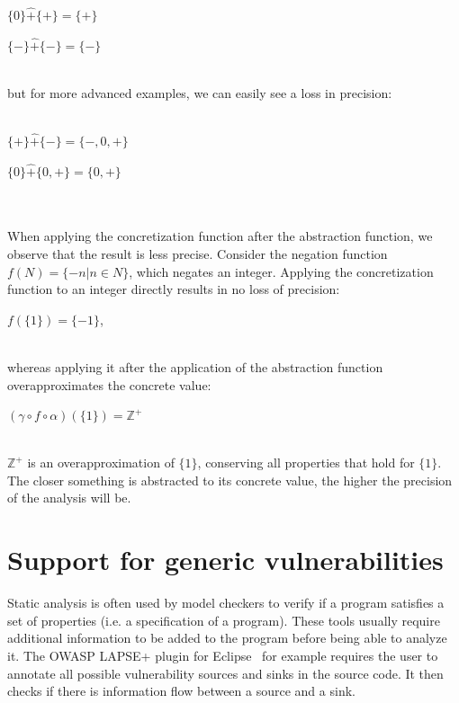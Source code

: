 \begin{exmp}
\centerline{$\{0\}  \hat{+}  \{+\} = \{+\}$}
\centerline{$\{-\}  \hat{+}  \{-\} = \{-\}$}
\leavevmode \\
but for more advanced examples, we can easily see a loss in precision:\\\\
\centerline{$\{+\}  \hat{+}  \{-\} = \{-,0,+\}$}
\centerline{$\{0\}  \hat{+}  \{0,+\} = \{0,+\}$}
\\\\
When applying the concretization function after the abstraction function, we observe that the result is less precise. Consider the negation function $f(N) = \{-n \vert n \in N\}$, which negates an integer. Applying the concretization function to an integer directly results in no loss of precision:\\ 
\centerline{$f(\{1\}) = \{-1\}$,}\\ whereas applying it after the application of the abstraction function overapproximates the concrete value: \\
\centerline{$(\gamma \circ f \circ \alpha)(\{1\}) = \mathbb{Z}^+$}\\
$\mathbb{Z}^+$ is an overapproximation of $\{1\}$, conserving all properties that hold for $\{1\}$. The closer something is abstracted to its concrete value, the higher the precision of the analysis will be.
\end{exmp}


\section{Support for generic vulnerabilities}
\label{sec:genericVulnerabilities}

Static analysis is often used by model checkers to verify if a program satisfies a set of properties (i.e. a specification of a program). These tools usually require additional information to be added to the program before being able to analyze it. The OWASP LAPSE+ plugin for Eclipse~\cite{OWASP:LAPSE} for example requires the user to annotate all possible vulnerability sources and sinks in the source code. It then checks if there is information flow between a source and a sink. 

